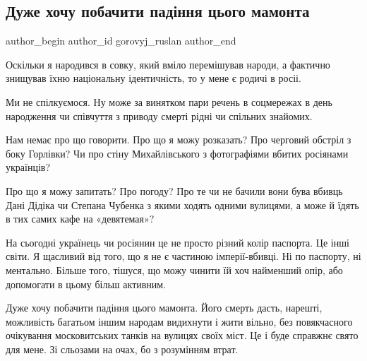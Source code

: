  
 
 
 
 
 
\subsection{Дуже хочу побачити падіння цього мамонта}
\label{sec:06_01_2022.fb.gorovyj_ruslan.2.padenie_mamonta_rossia}
 
\ifcmt
 author_begin
   author_id gorovyj_ruslan
 author_end
\fi

Оскільки я народився в совку, який вміло перемішував народи, а фактично
знищував їхню національну ідентичність, то у мене є родичі в росіі.

Ми не спілкуємося. Ну може за винятком пари речень в соцмережах в день
народження чи співчуття з приводу смерті рідні чи спільних знайомих. 

Нам немає про що говорити. Про що я можу розказать? Про черговий обстріл з боку
Горлівки? Чи про стіну Михайлівського з фотографіями вбитих росіянами
українців?

Про що я можу запитать? Про погоду? Про те чи не бачили вони бува вбивць Дані
Дідіка чи Степана Чубенка з якими ходять одними вулицями, а може й їдять в тих
самих кафе на «девятемая»?

На сьогодні українець чи росіянин це не просто різний колір паспорта. Це інші
світи. Я щасливий від того, що я не є частиною імперії-вбивці. Ні по паспорту,
ні ментально. Більше того, тішуся, що можу чинити їй хоч найменший опір, або
допомогати в цьому більш активним.

Дуже хочу побачити падіння цього мамонта. Його смерть дасть, нарешті,
можливість багатьом іншим народам видихнути і жити вільно, без повякчасного
очікування московитських танків на вулицях своїх міст. Це і буде справжнє свято
для мене. Зі сльозами на очах, бо з розумінням втрат.


